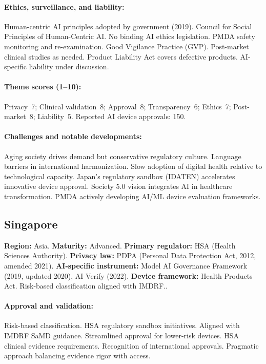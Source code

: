 {\paragraph{Ethics, surveillance, and liability:}
Human-centric AI principles adopted by government (2019). Council for Social Principles of Human-Centric AI. No binding AI ethics legislation.
PMDA safety monitoring and re-examination. Good Vigilance Practice (GVP). Post-market clinical studies as needed.
Product Liability Act covers defective products. AI-specific liability under discussion.

\paragraph{Theme scores (1--10):}
Privacy~7;
Clinical validation~8;
Approval~8;
Transparency~6;
Ethics~7;
Post-market~8;
Liability~5.
Reported AI device approvals: 150.

\paragraph{Challenges and notable developments:}
Aging society drives demand but conservative regulatory culture. Language barriers in international harmonization. Slow adoption of digital health relative to technological capacity.
Japan's regulatory sandbox (IDATEN) accelerates innovative device approval. Society 5.0 vision integrates AI in healthcare transformation. PMDA actively developing AI/ML device evaluation frameworks.


\subsection{Singapore}
\textbf{Region:} Asia.
\textbf{Maturity:} Advanced.
\textbf{Primary regulator:} HSA (Health Sciences Authority).
\textbf{Privacy law:} PDPA (Personal Data Protection Act, 2012, amended 2021).
\textbf{AI-specific instrument:} Model AI Governance Framework (2019, updated 2020), AI Verify (2022).
\textbf{Device framework:} Health Products Act. Risk-based classification aligned with IMDRF..

\paragraph{Approval and validation:}
Risk-based classification. HSA regulatory sandbox initiatives. Aligned with IMDRF SaMD guidance. Streamlined approval for lower-risk devices.
HSA clinical evidence requirements. Recognition of international approvals. Pragmatic approach balancing evidence rigor with access.

}
